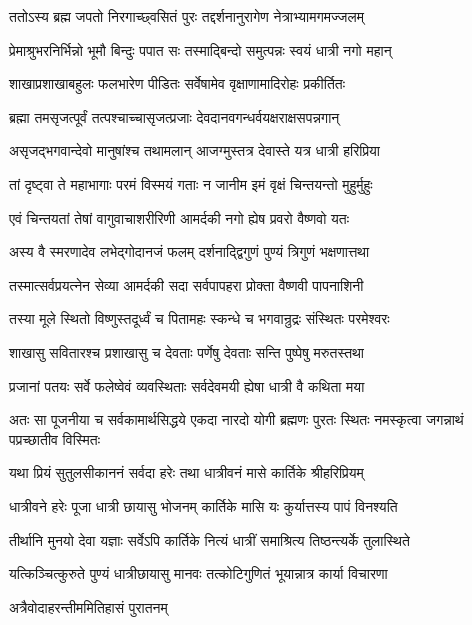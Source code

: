 \twolineshloka
{ततोऽस्य ब्रह्म जपतो निरगाच्छ्वसितं पुरः}
{तद्दर्शनानुरागेण नेत्राभ्यामगमज्जलम्} %

\twolineshloka
{प्रेमाश्रुभरनिर्भिन्नो भूमौ बिन्दुः पपात सः}
{तस्माद्बिन्दो समुत्पन्नः स्वयं धात्री नगो महान्} %

\twolineshloka
{शाखाप्रशाखाबहुलः फलभारेण पीडितः}
{सर्वेषामेव वृक्षाणामादिरोहः प्रकीर्तितः} %

\twolineshloka
{ब्रह्मा तमसृजत्पूर्वं तत्पश्चाच्चासृजत्प्रजाः}
{देवदानवगन्धर्वयक्षराक्षसपन्नगान्} %

\twolineshloka
{असृजद्भगवान्देवो मानुषांश्च तथामलान्}
{आजग्मुस्तत्र देवास्ते यत्र धात्री हरिप्रिया} %

\twolineshloka
{तां दृष्ट्वा ते महाभागाः परमं विस्मयं गताः}
{न जानीम इमं वृक्षं चिन्तयन्तो मुहुर्मुहुः} %

\twolineshloka
{एवं चिन्तयतां तेषां वागुवाचाशरीरिणी}
{आमर्दकी नगो ह्येष प्रवरो वैष्णवो यतः} %

\twolineshloka
{अस्य वै स्मरणादेव लभेद्गोदानजं फलम्}
{दर्शनाद्द्विगुणं पुण्यं त्रिगुणं भक्षणात्तथा} %

\twolineshloka
{तस्मात्सर्वप्रयत्नेन सेव्या आमर्दकी सदा}
{सर्वपापहरा प्रोक्ता वैष्णवी पापनाशिनी} %

\twolineshloka
{तस्या मूले स्थितो विष्णुस्तदूर्ध्वं च पितामहः}
{स्कन्धे च भगवान्रुद्रः संस्थितः परमेश्वरः} %

\twolineshloka
{शाखासु सवितारश्च प्रशाखासु च देवताः}
{पर्णेषु देवताः सन्ति पुष्पेषु मरुतस्तथा} %

\twolineshloka
{प्रजानां पतयः सर्वे फलेष्वेवं व्यवस्थिताः}
{सर्वदेवमयी ह्येषा धात्री वै कथिता मया} %

\threelineshloka
{अतः सा पूजनीया च सर्वकामार्थसिद्धये}
{एकदा नारदो योगी ब्रह्मणः पुरतः स्थितः}
{नमस्कृत्वा जगन्नाथं पप्रच्छातीव विस्मितः} %


\twolineshloka
{यथा प्रियं सुतुलसीकाननं सर्वदा हरेः}
{तथा धात्रीवनं मासे कार्तिके श्रीहरिप्रियम्} %


\twolineshloka
{धात्रीवने हरेः पूजा धात्री छायासु भोजनम्}
{कार्तिके मासि यः कुर्यात्तस्य पापं विनश्यति} %

\twolineshloka
{तीर्थानि मुनयो देवा यज्ञाः सर्वेऽपि कार्तिके}
{नित्यं धात्रीं समाश्रित्य तिष्ठन्त्यर्के तुलास्थिते} %

\twolineshloka
{यत्किञ्चित्कुरुते पुण्यं धात्रीछायासु मानवः}
{तत्कोटिगुणितं भूयान्नात्र कार्या विचारणा} %


\onelineshloka
{अत्रैवोदाहरन्तीममितिहासं पुरातनम्} %

